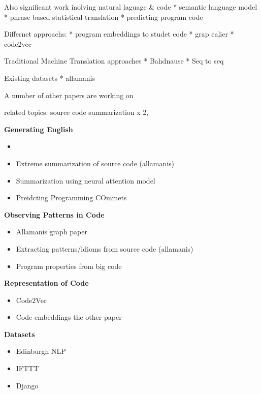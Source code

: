 Also significant work inolving natural laguage \& code
* semantic language model
* phrase based statistical translation
* predicting program code

Differnet approachs:
* program embeddings to studet code
* grap ealier
* code2vec

Traditional Machine Translation approaches
* Bahdnause
* Seq to seq

Existing datasets
* allamanis


A number of other papers are working on 


related topics: source code summarization x 2, 

\textbf{Generating English}
\begin{itemize}
    \item 
    \item Extreme summarization of source code (allamanis)
    \item Summarization using neural attention model
    \item Preidcting Programming COmmets
\end{itemize}

\textbf{Observing Patterns in Code}
\begin{itemize}
    \item Allamanis graph paper
    \item Extracting patterns/idioms from source code (allamanis)
    \item Program properties from big code
\end{itemize}

\textbf{Representation of Code}
\begin{itemize}
    \item Code2Vec
    \item Code embeddings the other paper
\end{itemize}

\textbf{Datasets}
\begin{itemize}
    \item Edinburgh NLP
    \item IFTTT
    \item Django 
\end{itemize}




